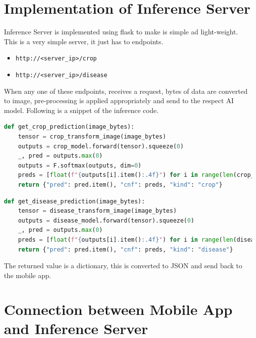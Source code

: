 \documentclass[../Report.tex]{subfiles}
\begin{document}
\begin{description}
\end{description}

\section{Implementation of Inference Server} \label{sec:inference_server}

Inference Server is implemented using flask to make is simple ad light-weight. This is a very simple server, it just has to endpoints.

\begin{itemize}
  \item \texttt{http://<server\_ip>/crop}
  \item \texttt{http://<server\_ip>/disease}
\end{itemize}

When any one of these endpoints, receives a request, bytes of data are converted to image, pre-processing is applied appropriately 
and send to the respect AI model. Following is a snippet of the inference code.

\begin{lstlisting}[language=python,caption={Crop Inference Code},captionpos=b]
  def get_crop_prediction(image_bytes):
    tensor = crop_transform_image(image_bytes)
    outputs = crop_model.forward(tensor).squeeze(0)
    _, pred = outputs.max(0)
    outputs = F.softmax(outputs, dim=0)
    preds = [float(f"{outputs[i].item():.4f}") for i in range(len(crop_class_names))]
    return {"pred": pred.item(), "cnf": preds, "kind": "crop"}
\end{lstlisting}

\begin{lstlisting}[language=python,caption={Crop Inference Code},captionpos=b]
  def get_disease_prediction(image_bytes):
    tensor = disease_transform_image(image_bytes)
    outputs = disease_model.forward(tensor).squeeze(0)
    _, pred = outputs.max(0)
    preds = [float(f"{outputs[i].item():.4f}") for i in range(len(diseases_class_names))]
    return {"pred": pred.item(), "cnf": preds, "kind": "disease"}
\end{lstlisting}

The returned value is a dictionary, this is converted to JSON and send back to the mobile app.

\section{Connection between Mobile App and Inference Server}
\end{document}
